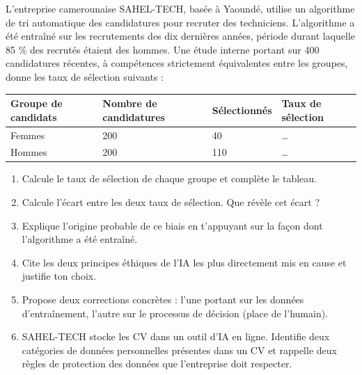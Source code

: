 \documentclass[11pt]{article}
\begin{document}
\begin{exercice}
L'entreprise camerounaise SAHEL-TECH, basée à Yaoundé, utilise un algorithme de tri automatique des candidatures pour recruter des techniciens. L'algorithme a été entraîné sur les recrutements des dix dernières années, période durant laquelle 85 \% des recrutés étaient des hommes. Une étude interne portant sur 400 candidatures récentes, à compétences strictement équivalentes entre les groupes, donne les taux de sélection suivants :

\begin{center}
\begin{tabularx}{\linewidth}{|l|X|X|X|}
\hline
\rowcolor{popblueL} \textbf{Groupe de candidats} & \textbf{Nombre de candidatures} & \textbf{Sélectionnés} & \textbf{Taux de sélection} \\
\hline
Femmes & 200 & 40 & \ldots \\
\hline
Hommes & 200 & 110 & \ldots \\
\hline
\end{tabularx}
\end{center}

\begin{enumerate}
\item Calcule le taux de sélection de chaque groupe et complète le tableau.
\item Calcule l'écart entre les deux taux de sélection. Que révèle cet écart ?
\item Explique l'origine probable de ce biais en t'appuyant sur la façon dont l'algorithme a été entraîné.
\item Cite les deux principes éthiques de l'IA les plus directement mis en cause et justifie ton choix.
\item Propose deux corrections concrètes : l'une portant sur les données d'entraînement, l'autre sur le processus de décision (place de l'humain).
\item SAHEL-TECH stocke les CV dans un outil d'IA en ligne. Identifie deux catégories de données personnelles présentes dans un CV et rappelle deux règles de protection des données que l'entreprise doit respecter.
\end{enumerate}
\end{exercice}
\end{document}

